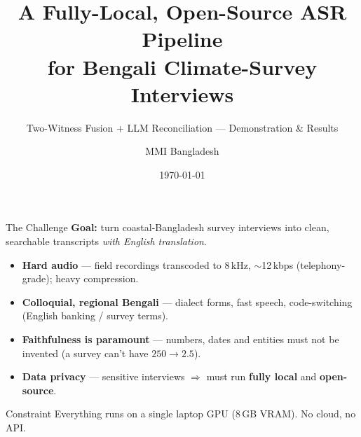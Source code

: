 \documentclass[aspectratio=169,10pt]{beamer}
\title[Local Bengali ASR Pipeline]{A Fully-Local, Open-Source ASR Pipeline\\for Bengali Climate-Survey Interviews}
\subtitle{Two-Witness Fusion + LLM Reconciliation --- Demonstration \& Results}
\author{MMI Bangladesh}
\institute{Innovations for Poverty Action (IPA)}
\date{\today}
\begin{document}
\begin{frame}\titlepage\end{frame}

\begin{frame}{The Challenge}
  \textbf{Goal:} turn coastal-Bangladesh survey interviews into clean,
  searchable transcripts \emph{with English translation}.
  \vspace{0.4em}
  \begin{itemize}
    \item \textbf{Hard audio} --- field recordings transcoded to 8\,kHz,
          $\sim$12\,kbps (telephony-grade); heavy compression.
    \item \textbf{Colloquial, regional Bengali} --- dialect forms, fast
          speech, code-switching (English banking / survey terms).
    \item \textbf{Faithfulness is paramount} --- numbers, dates and
          entities must not be invented (a survey can't have $250 \to 2.5$).
    \item \textbf{Data privacy} --- sensitive interviews $\Rightarrow$ must
          run \textbf{fully local} and \textbf{open-source}.
  \end{itemize}
  \vspace{0.3em}
  \begin{block}{Constraint}
    Everything runs on a single laptop GPU (8\,GB VRAM). No cloud, no API.
  \end{block}
\end{frame}
\end{document}

